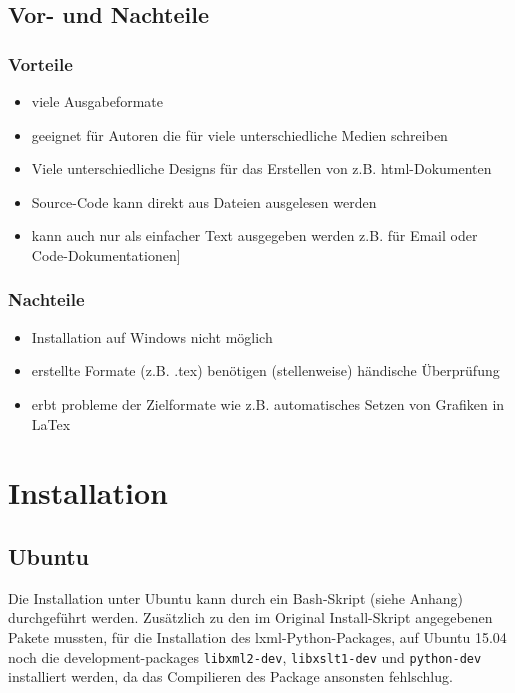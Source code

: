 \documentclass[%
oneside,                 %
final,                   %
chapterprefix=true,      %
open=right,              %
10pt]{book}
\begin{document}
\section{Vor- und Nachteile}
\subsection{Vorteile}
\begin{itemize}
\item viele Ausgabeformate

\item geeignet für Autoren die für viele unterschiedliche Medien schreiben

\item Viele unterschiedliche Designs für das Erstellen von z.B. html-Dokumenten

\item Source-Code kann direkt aus Dateien ausgelesen werden

\item kann auch nur als einfacher Text ausgegeben werden z.B. für Email oder Code-Dokumentationen]
\end{itemize}

\noindent
\subsection{Nachteile}
\begin{itemize}
 \item Installation auf Windows nicht möglich

 \item erstellte Formate (z.B. .tex) benötigen (stellenweise) händische Überprüfung

 \item erbt probleme der Zielformate wie z.B. automatisches Setzen von Grafiken in LaTex
\end{itemize}

\noindent
\chapter{Installation}
\section{Ubuntu}
Die Installation unter Ubuntu kann durch ein Bash-Skript (siehe Anhang) durchgeführt werden. Zusätzlich zu den im Original Install-Skript angegebenen Pakete mussten, für die Installation des lxml-Python-Packages, auf Ubuntu 15.04 noch die development-packages  \texttt{libxml2-dev}, \texttt{libxslt1-dev} und \texttt{python-dev} installiert werden, da das Compilieren des Package ansonsten fehlschlug.
\end{document}
